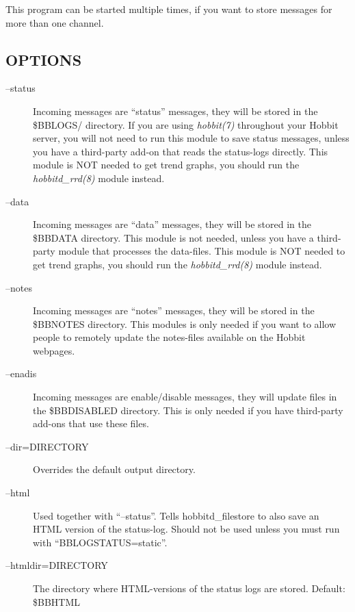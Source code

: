   This program can be started multiple times, if you want to store messages for more than one channel. 


 
\subsection{OPTIONS}
\begin{description}
\item[--status] Incoming messages are ``status'' messages, they will be stored in the \$BBLOGS/ directory. If you are using \emph{hobbit(7)}
 throughout your Hobbit server, you will not need to run this module to save status messages, unless you have a third-party add-on that reads the status-logs directly. This module is NOT needed to get trend graphs, you should run the \emph{hobbitd\_rrd(8)}
 module instead. 

 

\item[--data] Incoming messages are ``data'' messages, they will be stored in the \$BBDATA directory. This module is not needed, unless you have a third-party module that processes the data-files. This module is NOT needed to get trend graphs, you should run the \emph{hobbitd\_rrd(8)}
 module instead. 

 

\item[--notes] Incoming messages are ``notes'' messages, they will be stored in the \$BBNOTES directory. This modules is only needed if you want to allow people to remotely update the notes-files available on the Hobbit webpages. 

 

\item[--enadis] Incoming messages are enable/disable messages, they will update files in the \$BBDISABLED directory. This is only needed if you have third-party add-ons that use these files. 

 

\item[--dir=DIRECTORY] Overrides the default output directory. 

 

\item[--html] Used together with ``--status''. Tells hobbitd\_filestore to also save an HTML version of the status-log. Should not be used unless you must run with ``BBLOGSTATUS=static''. 

 

\item[--htmldir=DIRECTORY] The directory where HTML-versions of the status logs are stored. Default: \$BBHTML 


\end{description}

